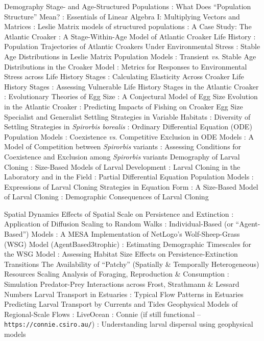\documentclass[10pt,a4paper]{article}
\begin{document}
\begin{outline}[enumerate]
\1 Demography
	\2 Stage- and Age-Structured Populations
		\3 \QE: What Does ``Population Structure'' Mean?
		\3 \QE: Essentials of Linear Algebra I: Multiplying Vectors and Matrices
		\3 \QE: Leslie Matrix models of structured populations
		\3 \QE: A Case Study: The Atlantic Croaker
		\3 \NB: A Stage-Within-Age Model of Atlantic Croaker Life History
		\3 \EA: Population Trajectories of Atlantic Croakers Under Environmental Stress
		\3 \QE: Stable Age Distributions in Leslie Matrix Population Models
		\3 \EA: Transient \textit{vs}. Stable Age Distributions in the Croaker Model 
		\3 \QE: Metrics for Responses to Environmental Stress across Life History Stages
		\3 \NB: Calculating Elasticity Across Croaker Life History Stages
		\3 \EA: Assessing Vulnerable Life History Stages in the Atlantic Croaker   
		\3 \QE: Evolutionary Theories of Egg Size
		\3 \NB: A Conjectural Model of Egg Size Evolution in the Atlantic Croaker
		\3 \EA: Predicting Impacts of Fishing on Croaker Egg Size
	\2 Specialist and Generalist Settling Strategies in Variable Habitats
		\3 \QE: Diversity of Settling Strategies in \textit{Spirorbis borealis}
		\3 \QE: Ordinary Differential Equation (ODE) Population Models
		\3 \QE: Coexistence \textit{vs}. Competitive Exclusion in ODE Models 
		\3 \NB: A Model of Competition between \textit{Spirorbis} variants
		\3 \EA: Assessing Conditions for Coexistence and Exclusion among \textit{Spirorbis} variants
	\2 Demography of Larval Cloning
		\3 \QE: Size-Based Models of Larval Development
		\3 \QE: Larval Cloning in the Laboratory and in the Field
		\3 \QE: Partial Differential Equation Population Models
		\3 \QE: Expressions of Larval Cloning Strategies in Equation Form
		\3 \NB: A Size-Based Model of Larval Cloning
		\3 \EA: Demographic Consequences of Larval Cloning

\1 Spatial Dynamics 
	\2 Effects of Spatial Scale on Persistence and Extinction
		\3 \QE: Application of Diffusion Scaling to Random Walks
		\3 \QE: Individual-Based (or ``Agent-Based'') Models
		\3 \NB: A MESA Implementation of NetLogo's Wolf-Sheep-Grass (WSG) Model (AgentBased3trophic)
		\3 \EA: Estimating Demographic Timescales for the WSG Model
		\3 \EA: Assessing Habitat Size Effects on Persistence-Extinction Transitions
	\2 The Availability of ``Patchy'' (Spatially \& Temporally Heterogeneous) Resources 
		\3 \QE  Scaling Analysis of Foraging, Reproduction \& Consumption
		\3 \NB: Simulation Predator-Prey Interactions across Frost, Strathmann \& Lessard Numbers 
	\2 Larval Transport in Estuaries
		\3 \QE: Typical Flow Patterns in Estuaries
	\2 Predicting Larval Transport by Currents and Tides
		\3 Geophysical Models of Regional-Scale Flows
		\3 \NB: LiveOcean
		\3 \NB: Connie (if still functional -- \verb|https://connie.csiro.au/|)
		\3 \EA: Understanding larval dispersal using geophysical models


\end{outline}
\end{document}
